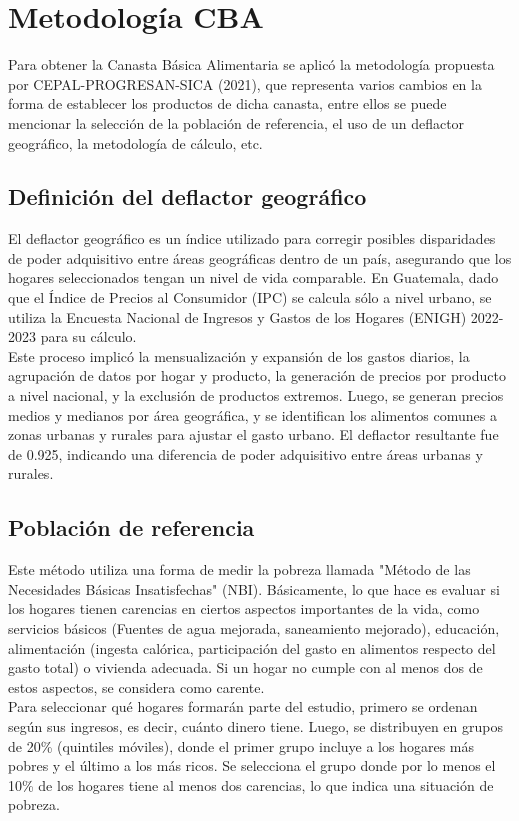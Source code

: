 \documentclass[letterpaper, 12pt, twoside]{article}
\begin{document}
\newpage

\section*{Metodología CBA}

Para obtener la Canasta Básica Alimentaria se aplicó la metodología propuesta
por CEPAL-PROGRESAN-SICA (2021), que representa varios cambios en la forma de
establecer los productos de dicha canasta, entre ellos se puede mencionar la
selección de la población de referencia, el uso de un deflactor geográfico, la
metodología de cálculo, etc.

\subsection{Definición del deflactor geográfico}

El deflactor geográfico es un índice utilizado para corregir posibles
disparidades de poder adquisitivo entre áreas geográficas dentro de un país,
asegurando que los hogares seleccionados tengan un nivel de vida comparable.
En Guatemala, dado que el Índice de Precios al Consumidor (IPC) se calcula sólo
a nivel urbano, se utiliza la Encuesta Nacional de Ingresos y Gastos de los
Hogares (ENIGH) 2022-2023 para su cálculo.
\\[\baselineskip]
Este proceso implicó la mensualización y expansión de los gastos diarios, la
agrupación de datos por hogar y producto, la generación de precios por producto
a nivel nacional, y la exclusión de productos extremos.
Luego, se generan precios medios y medianos por área geográfica, y se
identifican los alimentos comunes a zonas urbanas y rurales para ajustar el
gasto urbano.
El deflactor resultante fue de 0.925, indicando una diferencia de poder
adquisitivo entre áreas urbanas y rurales.

\subsection{Población de referencia}

Este método utiliza una forma de medir la pobreza llamada "Método de las
Necesidades Básicas Insatisfechas" (NBI).
Básicamente, lo que hace es evaluar si los hogares tienen carencias en ciertos
aspectos importantes de la vida, como servicios básicos (Fuentes de agua
mejorada, saneamiento mejorado), educación, alimentación (ingesta calórica,
participación del gasto en alimentos respecto del gasto total) o vivienda adecuada.
Si un hogar no cumple con al menos dos de estos aspectos, se considera como carente.
\\[\baselineskip]
Para seleccionar qué hogares formarán parte del estudio, primero se ordenan
según sus ingresos, es decir, cuánto dinero tiene.
Luego, se distribuyen en grupos de 20\% (quintiles móviles), donde el primer
grupo incluye a los hogares más pobres y el último a los más ricos.
Se selecciona el grupo donde por lo menos el 10\% de los hogares tiene al menos
dos carencias, lo que indica una situación de pobreza.
\end{document}
